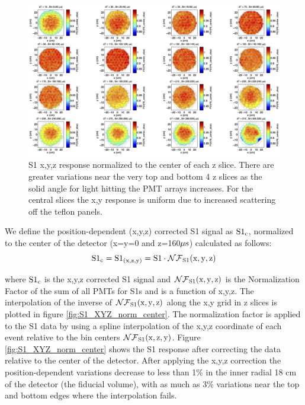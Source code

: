 \renewcommand{\baselinestretch}{1}
\small\normalsize
\begin{figure}\centering
\includegraphics[width=230mm]{Chapter_XYZ_Corr/Thesis_Corr_Plots/S1_XYZ_Kr_norm_center_slice_crop.png}
\caption{S1 x,y,z response normalized to the center of each z slice. There are greater variations near the very top and bottom 4 z slices as the solid angle for light hitting the PMT arrays increases. For the central slices the x,y response is uniform due to increased scattering off the teflon panels. }
\label{fig:S1_XYZ_norm_center_slice}
\end{figure}
\renewcommand{\baselinestretch}{2}
\small\normalsize

\newpage

We define the position-dependent  (x,y,z) corrected S1 signal as $\rm S1{_c}$, normalized to the center of the detector (x=y=0 and z=160$\rm \mu s$) calculated as follows:
\begin{equation}
\rm S1_{c}= S1_{(x,z,y)}=S1 \cdot \mathcal{NF}_{S1}(x,y,z)
\label{eq:S1_XYZ}
\end{equation}

\noindent where $\rm S1_{c}$ is the x,y,z corrected S1 signal and $\rm \mathcal{NF}_{S1}(x,y,z)$ is the Normalization Factor of the sum of all PMTs for S1s and is a function of x,y,z. The interpolation of the inverse of $\rm \mathcal{NF}_{S1}(x,y,z)$ along the x,y grid in z slices is plotted in figure \ref{fig:S1_XYZ_norm_center}. The normalization factor is applied to the S1 data by using a spline interpolation of the x,y,z coordinate of each event relative to the bin centers $\rm \mathcal{NF}_{S1}(x,z,y)$. Figure \ref{fig:S1_XYZ_norm_center} shows the S1 response after correcting the data relative to the center of the detector. After applying the x,y,z correction the position-dependent variations decrease to less than 1\% in the inner radial 18 cm of the detector (the fiducial volume), with as much as 3\% variations near the top and bottom edges where the interpolation fails.

